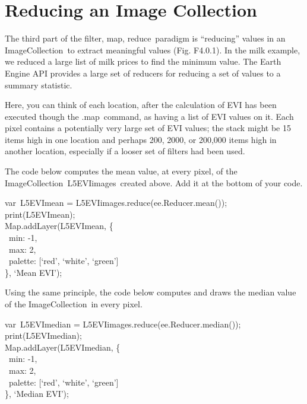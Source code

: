 \documentclass[
  letterpaper,
  DIV=11,
  numbers=noendperiod]{scrreprt}
\begin{document}
\hypertarget{reducing-an-image-collection}{%
\section{Reducing an Image
Collection}\label{reducing-an-image-collection}}

The third part of the filter, map, reduce~paradigm is ``reducing''
values in an ImageCollection~to extract meaningful values (Fig. F4.0.1).
In the milk example, we reduced a large list of milk prices to find the
minimum value. The Earth Engine API provides a large set of reducers for
reducing a set of values to a summary statistic.

Here, you can think of each location, after the calculation of EVI has
been executed though the .map~command, as having a list of EVI values on
it. Each pixel contains a potentially very large set of EVI values; the
stack might be 15 items high in one location and perhaps 200, 2000, or
200,000 items high in another location, especially if a looser set of
filters had been used.

The code below computes the mean value, at every pixel, of the
ImageCollection~L5EVIimages~created above. Add it at the bottom of your
code.

var~L5EVImean = L5EVIimages.reduce(ee.Reducer.mean());\\
print(L5EVImean);\\
Map.addLayer(L5EVImean, \{\\
\hspace*{0.333em} ~min: -1,\\
\hspace*{0.333em} ~max: 2,\\
\hspace*{0.333em} ~palette: {[}`red', `white', `green'{]}\\
\}, `Mean EVI');

Using the same principle, the code below computes and draws the median
value of the ImageCollection~in every pixel.

var~L5EVImedian = L5EVIimages.reduce(ee.Reducer.median());\\
print(L5EVImedian);\\
Map.addLayer(L5EVImedian, \{\\
\hspace*{0.333em} ~min: -1,\\
\hspace*{0.333em} ~max: 2,\\
\hspace*{0.333em} ~palette: {[}`red', `white', `green'{]}\\
\}, `Median EVI');
\end{document}
